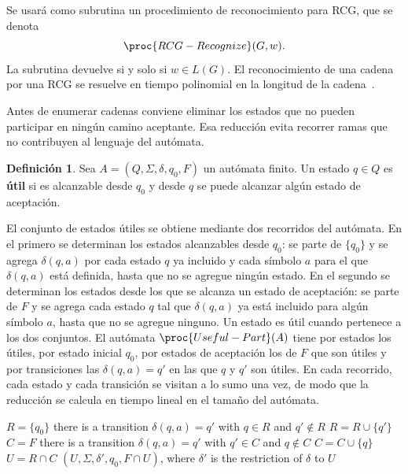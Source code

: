 \documentclass{report}
\theoremstyle{definition}
\newtheorem{definicion}{Definición}[chapter]
\theoremstyle{plain}
\theoremstyle{remark}
\begin{document}
Se usará como subrutina un procedimiento de reconocimiento para RCG, que
se denota
\[
  \proc{RCG-Recognize}(G,w).
\]
La subrutina devuelve  si y solo si $w \in L(G)$. El
reconocimiento de una cadena por una RCG se resuelve en tiempo
polinomial en la longitud de la
cadena~\cite{bertsch2001rcg,kallmeyer2010parsing}.

Antes de enumerar cadenas conviene eliminar los estados que no pueden
participar en ningún camino aceptante. Esa reducción evita recorrer
ramas que no contribuyen al lenguaje del autómata.

\begin{definicion}
  Sea $A=(Q,\Sigma,\delta,q_0,F)$ un autómata finito. Un estado $q\in Q$
  es \textbf{útil} si es alcanzable desde $q_0$ y desde
  $q$ se puede alcanzar algún estado de aceptación.
\end{definicion}

El conjunto de estados útiles se obtiene mediante dos recorridos del
autómata. En el primero se determinan los estados alcanzables desde
$q_0$: se parte de $\{q_0\}$ y se agrega $\delta(q,a)$ por cada estado
$q$ ya incluido y cada símbolo $a$ para el que $\delta(q,a)$ está
definida, hasta que no se agregue ningún estado. En el segundo se
determinan los estados desde los que se alcanza un estado de aceptación:
se parte de $F$ y se agrega cada estado $q$ tal que $\delta(q,a)$ ya
está incluido para algún símbolo $a$, hasta que no se agregue ninguno.
Un estado es útil cuando pertenece a los dos conjuntos. El autómata
$\proc{Useful-Part}(A)$ tiene por estados los útiles, por estado inicial
$q_0$, por estados de aceptación los de $F$ que son útiles y por
transiciones las $\delta(q,a)=q'$ en las que $q$ y $q'$ son útiles. En
cada recorrido, cada estado y cada transición se visitan a lo sumo una
vez, de modo que la reducción se calcula en tiempo lineal en el tamaño
del autómata.


\begin{codebox}
  \li $R = \{q_0\}$
  \li \While there is a transition $\delta(q,a)=q'$ with $q \in R$ and $q' \notin R$
  \li \Do $R = R \cup \{q'\}$
  \End
  \li $C = F$
  \li \While there is a transition $\delta(q,a)=q'$ with $q' \in C$ and $q \notin C$
  \li \Do $C = C \cup \{q\}$
  \End
  \li $U = R \cap C$
  \li \Return $(U, \Sigma, \delta', q_0, F \cap U)$, where $\delta'$ is the
  restriction of $\delta$ to $U$
\end{codebox}
\end{document}
